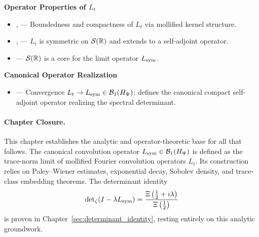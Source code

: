 \textbf{Operator Properties of \texorpdfstring{\( L_t \)}{Lt}}
\begin{itemize}
  \item {},  — Boundedness and compactness of \( L_t \) via mollified kernel structure.
  \item {},  — \( L_t \) is symmetric on \( \mathcal{S}(\mathbb{R}) \) and extends to a self-adjoint operator.
  \item {} — \( \mathcal{S}(\mathbb{R}) \) is a core for the limit operator \( L_{\mathrm{sym}} \).
\end{itemize}

\textbf{Canonical Operator Realization}
\begin{itemize}
  \item {} — Convergence \( L_t \to L_{\mathrm{sym}} \in \mathcal{B}_1(H_{\Psi}) \); defines the canonical compact self-adjoint operator realizing the spectral determinant.
\end{itemize}

\paragraph{Chapter Closure.}
This chapter establishes the analytic and operator-theoretic base for all that follows. The canonical convolution operator \( L_{\mathrm{sym}} \in \mathcal{B}_1(H_{\Psi}) \) is defined as the trace-norm limit of mollified Fourier convolution operators \( L_t \). Its construction relies on Paley–Wiener estimates, exponential decay, Sobolev density, and trace-class embedding theorems. The determinant identity
\[
\det\nolimits_{\zeta}(I - \lambda L_{\mathrm{sym}})
= \frac{\Xi\left(\tfrac{1}{2} + i\lambda \right)}{\Xi\left(\tfrac{1}{2} \right)}
\]
is proven in Chapter~\ref{sec:determinant_identity}, resting entirely on this analytic groundwork.
